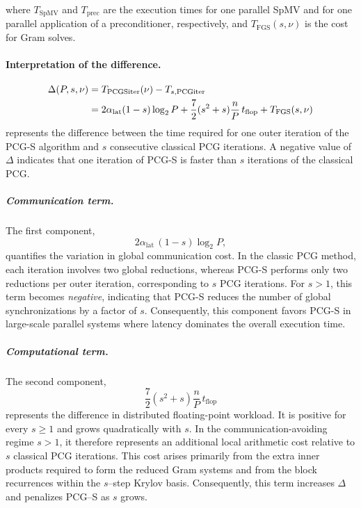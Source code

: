 \documentclass[pdflatex,sn-mathphys-num]{sn-jnl}%
\begin{document}
where $T_{\mathrm{SpMV}}$ and $T_{\mathrm{prec}}$ are the execution times for one parallel SpMV and for one parallel application of a preconditioner, respectively, and $T_{\mathrm{FGS}}(s,\nu)$ is the cost for Gram solves.

\paragraph{Interpretation of the difference.}

\begin{align}
\Delta(P,s,\nu)
&=
T_{\mathrm{PCGSiter}}(\nu)
-
T_{s,\mathrm{PCGiter}}
\notag
\\
&=
2\alpha_{\mathrm{lat}}(1-s)\log_2P
+
\frac{7}{2}(s^2+s)\frac{n}{P}\,t_{\mathrm{flop}}
+
T_{\mathrm{FGS}}(s,\nu)
\label{eq:delta}
\end{align}
represents the difference between the time required for one outer iteration of the
PCG-S algorithm and \(s\) consecutive classical PCG iterations.
A negative value of \(\Delta\) indicates that one iteration of PCG-S is faster than $s$ iterations of the classical PCG.

\subparagraph{Communication term.}
The first component,
\[
2\alpha_{\mathrm{lat}} \,(1 - s) \log_2 P,
\]
quantifies the variation in global communication cost.
In the classic PCG method, each iteration involves two global reductions,
whereas PCG-S performs only two reductions per outer iteration, corresponding to
$s$ PCG iterations.
For \(s>1\), this term becomes \emph{negative}, indicating that PCG-S reduces the number of global synchronizations by a factor of $s$.
Consequently, this component favors PCG-S in large-scale parallel systems where latency dominates the overall execution time.

\subparagraph{Computational term.}
The second component,
\[
\frac{7}{2}(s^2+s)\frac{n}{P}\,t_{\mathrm{flop}}
\]
represents the difference in distributed floating-point workload.
It is positive for every $s\geq1$ and grows quadratically with $s$.
In the communication-avoiding regime $s>1$, it therefore represents
an additional local arithmetic cost relative to $s$ classical PCG
iterations. This cost arises primarily from the extra inner products
required to form the reduced Gram systems and from the block
recurrences within the $s$--step Krylov basis. Consequently, this
term increases $\Delta$ and penalizes PCG--S as $s$ grows.
\end{document}
